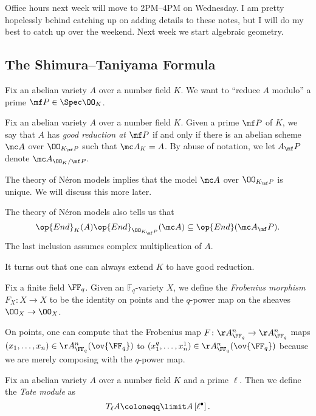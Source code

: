 \documentclass[../notes.tex]{subfiles}
\begin{document}
Office hours next week will move to 2PM--4PM on Wednesday. I am pretty hopelessly behind catching up on adding details to these notes, but I will do my best to catch up over the weekend. Next week we start algebraic geometry.

\subsection{The Shimura--Taniyama Formula}
Fix an abelian variety $A$ over a number field $K$. We want to ``reduce $A$ modulo'' a prime $\mf P\in\Spec\OO_K$.
\begin{definition}
	Fix an abelian variety $A$ over a number field $K$. Given a prime $\mf P$ of $K$, we say that $A$ has \textit{good reduction at $\mf P$} if and only if there is an abelian scheme $\mc A$ over $\OO_{K_\mf P}$ such that $\mc A_K=A$. By abuse of notation, we let $A_\mf P$ denote $\mc A_{\OO_K/\mf P}$.
\end{definition}
\begin{remark}
	The theory of N\'eron models implies that the model $\mc A$ over $\OO_{K_\mf P}$ is unique. We will discuss this more later.
\end{remark}
\begin{remark}
	The theory of N\'eron models also tells us that
	\[\op{End}_K(A)\op{End}_{\OO_{K_\mf P}}(\mc A)\subseteq\op{End}(\mc A_\mf P).\]
	The last inclusion assumes complex multiplication of $A$.
\end{remark}
\begin{remark}
	It turns out that one can always extend $K$ to have good reduction.
\end{remark}
\begin{definition}[Frobenius]
	Fix a finite field $\FF_q$. Given an $\mathbb F_q$-variety $X$, we define the \textit{Frobenius morphism} $F_X\colon X\to X$ to be the identity on points and the $q$-power map on the sheaves $\OO_X\to\OO_X$.
\end{definition}
\begin{remark}
	On points, one can compute that the Frobenius map $F\colon\AA^n_{\FF_q}\to\AA^n_{\FF_q}$ maps $(x_1,\ldots,x_n)\in\AA^n_{\FF_q}(\ov{\FF_q})$ to $(x_1^q,\ldots,x_n^1)\in\AA^n_{\FF_q}(\ov{\FF_q})$ because we are merely composing with the $q$-power map.
\end{remark}
\begin{definition}
	Fix an abelian variety $A$ over a number field $K$ and a prime $\ell$. Then we define the \textit{Tate module} as
	\[T_\ell A\coloneqq\limit A\left[\ell^\bullet\right].\]
\end{definition}
\end{document}
